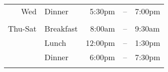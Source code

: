 \begin{center}
  \begin{tabular}{rlrcl}
    \\ \hline
    Wed & Dinner & 5:30pm&--&7:00pm  \\ \\
    Thu-Sat & Breakfast & 8:00am&--&9:30am \\
    & Lunch & 12:00pm&--&1:30pm \\
    & Dinner & 6:00pm&--&7:30pm \\
    \hline \\
  \end{tabular}
\end{center}
